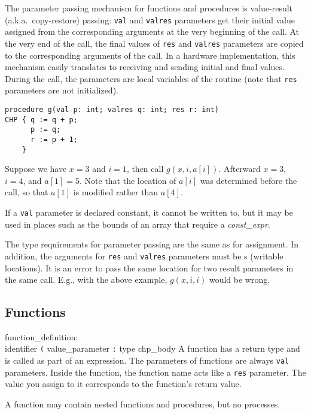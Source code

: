 The parameter passing mechanism for functions and procedures is value-result
(a.k.a.~copy-restore) passing: {\tt{}val} and {\tt{}valres} parameters
get their initial
value assigned from the corresponding arguments at the very beginning
of the call. At the very end of the call, the final values of
{\tt{}res} and {\tt{}valres} parameters are copied to the corresponding
arguments of the call. In a hardware implementation, this mechanism
easily translates to receiving and sending initial and
final values. During the call, the parameters are local variables of
the routine (note that {\tt{}res} parameters are not initialized).

\begin{verbatim}
procedure g(val p: int; valres q: int; res r: int)
CHP { q := q + p;
      p := q;
      r := p + 1;
    }
\end{verbatim}
Suppose we have $x=3$ and $i=1$, then call $g(x, i, a[i])$.
Afterward $x=3$, $i=4$, and $a[1]=5$. Note that the location of $a[i]$
was determined before the call, so that $a[1]$ is modified rather than
$a[4]$.

If a {\tt{}val} parameter is declared constant, it cannot be written to,
but it may be used in places such as the bounds of an array that require
a {\it{}const\_expr}.

The type requirements for parameter passing are the same as for
assignment. In addition, the arguments for {\tt{}res} and {\tt{}valres}
parameters must be \lvalue s (writable locations).
It is an error to pass the same location for two result parameters in
the same call. E.g., with the above example, $g(x, i, i)$ would be wrong.


\subsection{Functions}\label{sec:function}

\grammarstart
function\_definition: \\
       identifier {\tt{}(} value\_parameter\SEQ {\tt{})} {\tt{}:} type chp\_body
\grammarend
A function has a return type and is called as part of an expression.
The parameters of functions are always {\tt{}val} parameters. Inside the
function, the function name acts like a {\tt{}res} parameter. The value
you assign to it corresponds to the function's return value.

A function may contain nested functions and procedures, but no processes.


